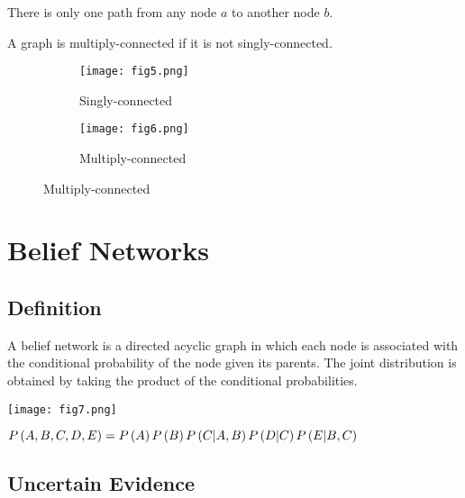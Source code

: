 \begin{description}[leftmargin=0cm]	
	\item[Singly-connected] There is only one path from any node $a$ to another node $b$.
	\item[Multiply-connected] A graph is multiply-connected if it is not singly-connected.
		\begin{figure*}[h]
			\centering
			\begin{subfigure}[b]{0.45\textwidth}
				\centering
				\texttt{[image: fig5.png]}
				\caption*{Singly-connected}
			\end{subfigure}
			\begin{subfigure}[b]{0.45\textwidth}
				\centering
				\texttt{[image: fig6.png]}
				\caption*{Multiply-connected}
			\end{subfigure}
		\end{figure*}
\end{description}

\section{Belief Networks}

\subsection{Definition}

A belief network is a directed acyclic graph in which each node is associated with the conditional probability of the node given its parents. The joint distribution is obtained by taking the product of the conditional probabilities.

\begin{minipage}{0.4\textwidth}
	\centering
	\texttt{[image: fig7.png]}
\end{minipage}
\begin{minipage}{0.6\textwidth}
	$\P{A,B,C,D,E}=\\ \P{A}\P{B}\P{C|A,B}\P{D|C}\P{E|B,C}$
\end{minipage}

\subsection{Uncertain Evidence}

